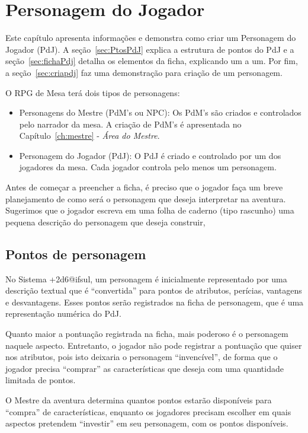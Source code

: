 \chapter{\label{ch:pdj}Personagem do Jogador}

Este capítulo apresenta informações e demonstra como criar um Personagem do Jogador (PdJ). A seção~\ref{sec:PtosPdJ} explica a estrutura de pontos do PdJ e a seção~\ref{sec:fichaPdj} detalha os elementos da ficha, explicando um a um. Por fim, a seção~\ref{sec:criapdj} faz uma demonstração para criação de um personagem.

O RPG de Mesa terá dois tipos de personagens: 
\begin{itemize}
	\item Personagens do Mestre (PdM's ou NPC): Os PdM's são criados e controlados pelo narrador da mesa. A criação de PdM's é apresentada no Capítulo~\ref{ch:mestre} - \emph{Área do Mestre}.
	
	\item Personagem do Jogador (PdJ): O PdJ é criado e controlado por um dos jogadores da mesa. Cada jogador controla pelo menos um personagem.
\end{itemize}

Antes de começar a preencher a ficha, é preciso que o jogador faça um breve planejamento de como será o personagem que deseja interpretar na aventura. Sugerimos que o jogador escreva em uma folha de caderno (tipo rascunho) uma pequena descrição do personagem que deseja construir,


\section{\label{sec:PtosPdJ}Pontos de personagem}

No Sistema +2d6@ifsul, um personagem é inicialmente representado por uma descrição textual que é ``convertida'' para pontos de atributos, perícias, vantagens e desvantagens. Esses pontos serão registrados na ficha de personagem, que é uma representação numérica do PdJ.

Quanto maior a pontuação registrada na ficha, mais poderoso é o personagem naquele aspecto. Entretanto, o jogador não pode registrar a pontuação que quiser nos atributos, pois isto deixaria o personagem ``invencível'', de forma que o jogador precisa ``comprar'' as características que deseja com uma quantidade limitada de pontos.

O Mestre da aventura determina quantos pontos estarão disponíveis para ``compra'' de características, enquanto os jogadores precisam escolher em quais aspectos pretendem ``investir'' em seu personagem, com os pontos disponíveis.

